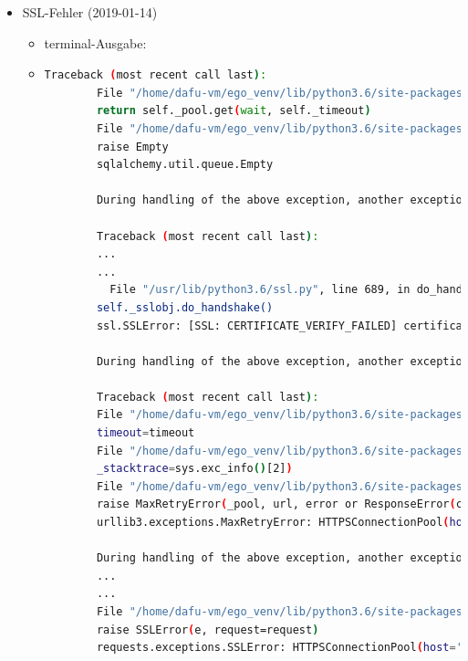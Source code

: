 \documentclass[
a4paper,     %
12pt         %
]{scrartcl}  %
\begin{document}
\begin{itemize}
\begin{itemize}
\begin{itemize}
			Als aktuelle Lösung kann ich leider nur das wiederholte starten der Berechnung angeben, da die technische Aufrüstung des Serverparks erst für Anfang 2019 vorgesehen ist. Mitte nächster Woche wird zu dem ein Großteil unserer Berechnungen abgeschlossen sein, sodass wiederum mehr Kapazitäten frei werden sollte.''
		\end{itemize}
	\end{itemize}

	\item SSL-Fehler (2019-01-14)
	\begin{itemize}
		\item terminal-Ausgabe:
		\item[] \begin{lstlisting}[language=bash]
		Traceback (most recent call last):
		File "/home/dafu-vm/ego_venv/lib/python3.6/site-packages/sqlalchemy/pool.py", line 1122, in _do_get
		return self._pool.get(wait, self._timeout)
		File "/home/dafu-vm/ego_venv/lib/python3.6/site-packages/sqlalchemy/util/queue.py", line 145, in get
		raise Empty
		sqlalchemy.util.queue.Empty

		During handling of the above exception, another exception occurred:

		Traceback (most recent call last):
		...
		...
		  File "/usr/lib/python3.6/ssl.py", line 689, in do_handshake
		self._sslobj.do_handshake()
		ssl.SSLError: [SSL: CERTIFICATE_VERIFY_FAILED] certificate verify failed (_ssl.c:847)

		During handling of the above exception, another exception occurred:

		Traceback (most recent call last):
		File "/home/dafu-vm/ego_venv/lib/python3.6/site-packages/requests/adapters.py", line 449, in send
		timeout=timeout
		File "/home/dafu-vm/ego_venv/lib/python3.6/site-packages/urllib3/connectionpool.py", line 638, in urlopen
		_stacktrace=sys.exc_info()[2])
		File "/home/dafu-vm/ego_venv/lib/python3.6/site-packages/urllib3/util/retry.py", line 398, in increment
		raise MaxRetryError(_pool, url, error or ResponseError(cause))
		urllib3.exceptions.MaxRetryError: HTTPSConnectionPool(host='openenergy-platform.org', port=443): Max retries exceeded with url: /api/v0/advanced/connection/open (Caused by SSLError(SSLError(1, '[SSL: CERTIFICATE_VERIFY_FAILED] certificate verify failed (_ssl.c:847)'),))

		During handling of the above exception, another exception occurred:
		...
		...
		File "/home/dafu-vm/ego_venv/lib/python3.6/site-packages/requests/adapters.py", line 514, in send
		raise SSLError(e, request=request)
		requests.exceptions.SSLError: HTTPSConnectionPool(host='openenergy-platform.org', port=443): Max retries exceeded with url: /api/v0/advanced/connection/open (Caused by SSLError(SSLError(1, '[SSL: CERTIFICATE_VERIFY_FAILED] certificate verify failed (_ssl.c:847)'),))



\end{lstlisting}
\end{itemize}
\end{itemize}
\end{document}
